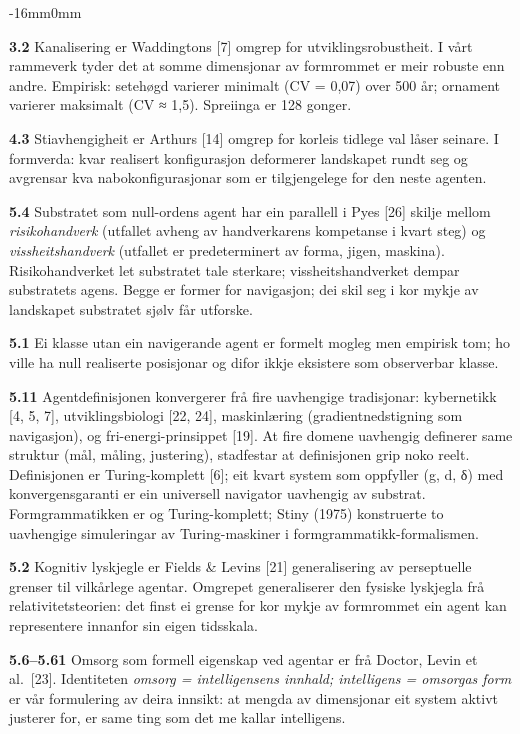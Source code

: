 \documentclass[10pt,oneside]{book}
\newcommand{\msym}[1]{{\mathfbfont #1}}
\newenvironment{widebody}{%
  \begin{adjustwidth}{-16mm}{0mm}%
}{%
  \end{adjustwidth}%
}
\begin{document}
\begin{widebody}
{\textbf{3.2} Kanalisering er Waddingtons [7] omgrep for utviklingsrobustheit. I vårt rammeverk tyder det at somme dimensjonar av formrommet er meir robuste enn andre. Empirisk: setehøgd varierer minimalt (CV = 0,07) over 500 år; ornament varierer maksimalt (CV \msym{≈} 1,5). Spreiinga er 128 gonger.

\textbf{4.3} Stiavhengigheit er Arthurs [14] omgrep for korleis tidlege val låser seinare. I formverda: kvar realisert konfigurasjon deformerer landskapet rundt seg og avgrensar kva nabokonfigurasjonar som er tilgjengelege for den neste agenten.

\textbf{5.4} Substratet som null-ordens agent har ein parallell i Pyes [26] skilje mellom \textit{risikohandverk} (utfallet avheng av handverkarens kompetanse i kvart steg) og \textit{vissheitshandverk} (utfallet er predeterminert av forma, jigen, maskina). Risikohandverket let substratet tale sterkare; vissheitshandverket dempar substratets agens. Begge er former for navigasjon; dei skil seg i kor mykje av landskapet substratet sjølv får utforske.

\textbf{5.1} Ei klasse utan ein navigerande agent er formelt mogleg men empirisk tom; ho ville ha null realiserte posisjonar og difor ikkje eksistere som observerbar klasse.

\textbf{5.11} Agentdefinisjonen konvergerer frå fire uavhengige tradisjonar: kybernetikk [4, 5, 7], utviklingsbiologi [22, 24], maskinlæring (gradientnedstigning som navigasjon), og fri-energi-prinsippet [19]. At fire domene uavhengig definerer same struktur (mål, måling, justering), stadfestar at definisjonen grip noko reelt. Definisjonen er Turing-komplett [6]; eit kvart system som oppfyller (g, d, \msym{δ}) med konvergensgaranti er ein universell navigator uavhengig av substrat. Formgrammatikken er og Turing-komplett; Stiny (1975) konstruerte to uavhengige simuleringar av Turing-maskiner i formgrammatikk-formalismen.

\textbf{5.2} Kognitiv lyskjegle er Fields \& Levins [21] generalisering av perseptuelle grenser til vilkårlege agentar. Omgrepet generaliserer den fysiske lyskjegla frå relativitetsteorien: det finst ei grense for kor mykje av formrommet ein agent kan representere innanfor sin eigen tidsskala.

\textbf{5.6--5.61} Omsorg som formell eigenskap ved agentar er frå Doctor, Levin et al.\ [23]. Identiteten \textit{omsorg = intelligensens innhald; intelligens = omsorgas form} er vår formulering av deira innsikt: at mengda av dimensjonar eit system aktivt justerer for, er same ting som det me kallar intelligens.

}
\end{widebody}
\end{document}
